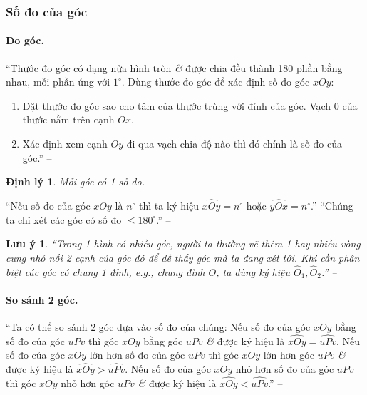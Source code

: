 \documentclass{article}
\numberwithin{equation}{section}
\newtheorem{luuy}{Lưu ý}[section]
\newtheorem{dinhly}{Định lý}[section]
\begin{document}
\subsubsection{Số đo của góc}

\paragraph{Đo góc.} ``Thước đo góc có dạng nửa hình tròn \textit{\&} được chia đều thành 180 phần bằng nhau, mỗi phần ứng với $1^\circ$. Dùng thước đo góc để xác định số đo góc $xOy$:
\begin{enumerate}
	\item Đặt thước đo góc sao cho tâm của thước trùng với đỉnh của góc. Vạch 0 của thước nằm trên cạnh $Ox$.
	\item Xác định xem cạnh $Oy$ đi qua vạch chia độ nào thì đó chính là số đo của góc.'' -- \cite[p. 96]{SGK_Toan_6_Canh_Dieu_tap_2}
\end{enumerate}

\begin{dinhly}
	Mỗi góc có 1 số đo.
\end{dinhly}
``Nếu số đo của góc $xOy$ là $n^\circ$ thì ta ký hiệu $\widehat{xOy} = n^\circ$ hoặc $\widehat{yOx} = n^\circ$.'' ``Chúng ta chỉ xét các góc có số đo $\le 180^\circ$.'' -- \cite[p. 96]{SGK_Toan_6_Canh_Dieu_tap_2}

\begin{luuy}
	``Trong 1 hình có nhiều góc, người ta thường vẽ thêm 1 hay nhiều vòng cung nhỏ nối 2 cạnh của góc đó để dễ thấy góc mà ta đang xét tới. Khi cần phân biệt các góc có chung 1 đỉnh, e.g., chung đỉnh $O$, ta dùng ký hiệu $\widehat{O}_1,\widehat{O}_2$.'' -- \cite[p. 98]{SGK_Toan_6_Canh_Dieu_tap_2}
\end{luuy}

\paragraph{So sánh 2 góc.} ``Ta có thể so sánh 2 góc dựa vào số đo của chúng: Nếu số đo của góc $xOy$ bằng số đo của góc $uPv$ thì góc $xOy$ bằng góc $uPv$ \textit{\&} được ký hiệu là $\widehat{xOy} = \widehat{uPv}$. Nếu số đo của góc $xOy$ lớn hơn số đo của góc $uPv$ thì góc $xOy$ lớn hơn góc $uPv$ \textit{\&} được ký hiệu là $\widehat{xOy} > \widehat{uPv}$. Nếu số đo của góc $xOy$ nhỏ hơn số đo của góc $uPv$ thì góc $xOy$ nhỏ hơn góc $uPv$ \textit{\&} được ký hiệu là $\widehat{xOy} < \widehat{uPv}$.'' -- \cite[p. 98]{SGK_Toan_6_Canh_Dieu_tap_2}
\end{document}
